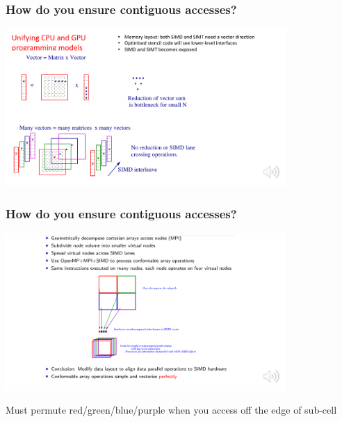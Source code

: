 \documentclass[pdf,ps,8pt]{beamer}
\begin{document}
\begin{frame}[fragile]\small\frametitle{ How do you ensure contiguous accesses?}
\includegraphics[width=0.8\textwidth]{Vectorise1.pdf}
\end{frame}
\begin{frame}[fragile]\small\frametitle{ How do you ensure contiguous accesses?}
  \includegraphics[width=0.8\textwidth]{Vectorise2.pdf}
  \begin{center}
    {\tiny Must permute red/green/blue/purple when you access off the edge of sub-cell }
\end{center}  
\end{frame}
\end{document}
